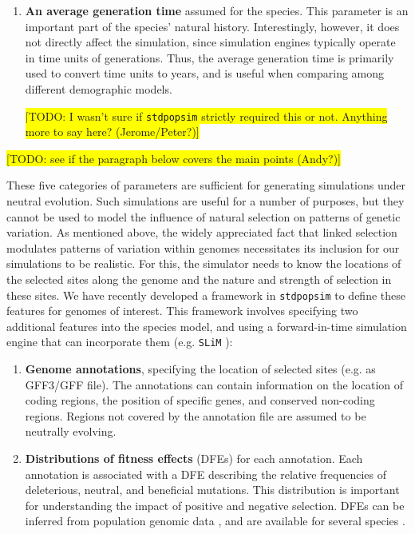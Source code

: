 \documentclass[hidelinks]{article}
\newcommand{\stdpopsim}{\texttt{stdpopsim}\xspace}
\begin{document}
\begin{enumerate}
\item
  \textbf{An average generation time} assumed for the species.
  This parameter is an important part of the species' natural history.
  Interestingly, however, it does not directly affect the simulation, since
  simulation engines typically operate in time units of generations. 
  Thus, the average generation time is primarily used to convert time units to years, 
  and is useful when comparing among different demographic models.

  \colorbox{yellow}{[TODO: I wasn't sure if \stdpopsim strictly required this or not. Anything more to say here? (Jerome/Peter?)]}

\end{enumerate}

\colorbox{yellow}{[TODO: see if the paragraph below covers the main points (Andy?)]}

These five categories of parameters are sufficient for generating simulations
under neutral evolution. Such simulations are useful for a number of purposes,
but they cannot be used to model the influence of natural selection on patterns of genetic variation.
As mentioned above, the widely appreciated fact that linked selection modulates
patterns of variation within genomes necessitates its inclusion for our simulations to be
realistic. For this, the simulator needs to know
the locations of the selected sites along the genome and the nature and strength
of selection in these sites. We have recently developed a framework in \stdpopsim
to define these features for genomes of interest.
This framework involves specifying two additional features into the species model,
and using a forward-in-time simulation engine that can incorporate
them (e.g. \texttt{SLiM} \citep{Haller2019}):

\begin{enumerate}
	\def\labelenumi{\arabic{enumi}.}
	\setcounter{enumi}{5}
	\item
	\textbf{Genome annotations}, specifying the location of selected sites (e.g. as GFF3/GFF file).
  The annotations can contain information on the location of coding regions,
  the position of specific genes, and conserved non-coding regions.
  Regions not covered by the annotation file are assumed to be neutrally evolving.
	\item
	\textbf{Distributions of fitness effects} (DFEs) for each annotation.
  Each annotation is associated with a DFE describing the relative frequencies of deleterious,
  neutral, and beneficial mutations. This distribution is important for understanding
  the impact of positive and negative selection. DFEs can be inferred from population
  genomic data \citep[reviewed in][]{Eyre-Walker2007}, and are available for several species \citep[e.g.][]{Ma2013, Huber2018}.
\end{enumerate}
\end{document}

